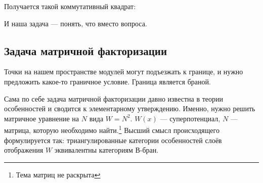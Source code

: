 \documentclass[11pt]{article}
\theoremstyle{remark}
\theoremstyle{definition}
\newcommand{\que}[1]{\footnote{\textcolor[rgb]{0.38,0.69,0.82}{#1}}}
\begin{document}
Получается такой коммутативный квадрат:


\begin{center}

\end{center}

И наша задача --- понять, что вместо вопроса.

\subsection{Задача матричной факторизации}

Точки на нашем пространстве модулей могут подъезжать к границе, и нужно предложить какое-то граничное условие. Граница является браной.

Сама по себе задача матричной факторизации давно известна в теории особенностей и сводится к элементарному утверждению. Именно, нужно решить матричное уравнение на $N$ вида $W = N^2$. $W(x)$ --- суперпотенциал, $N$ --- матрица, которую необходимо найти.\que{Тема матриц не раскрыта} Высший смысл происходящего формулируется так: триангулированные категории особенностей слоёв отображения $W$ эквивалентны категориям В-бран.
\end{document}

